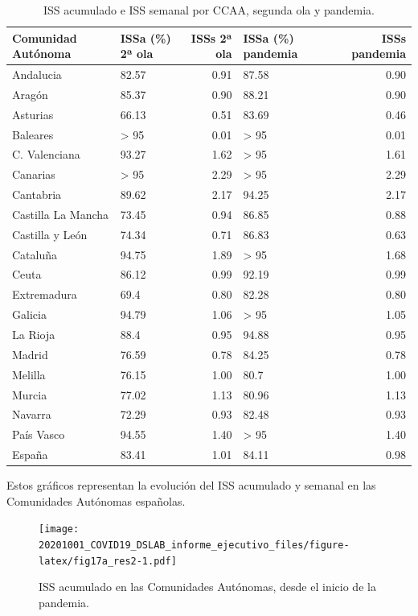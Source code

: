 \documentclass[
  11pt,
]{article}
\begin{document}
\begin{table}[!h]

\caption{\label{tab:tabla}ISS acumulado e ISS semanal por CCAA, segunda ola y pandemia.}
\centering
\fontsize{9}{11}\selectfont
\begin{tabular}[t]{l|l|r|l|r}
\hline
Comunidad Autónoma & ISSa (\%) 2ª ola & ISSs 2ª ola & ISSa (\%) pandemia & ISSs pandemia\\
\hline
Andalucia & 82.57 & 0.91 & 87.58 & 0.90\\
\hline
Aragón & 85.37 & 0.90 & 88.21 & 0.90\\
\hline
Asturias & 66.13 & 0.51 & 83.69 & 0.46\\
\hline
Baleares & > 95 & 0.01 & > 95 & 0.01\\
\hline
C. Valenciana & 93.27 & 1.62 & > 95 & 1.61\\
\hline
Canarias & > 95 & 2.29 & > 95 & 2.29\\
\hline
Cantabria & 89.62 & 2.17 & 94.25 & 2.17\\
\hline
Castilla La Mancha & 73.45 & 0.94 & 86.85 & 0.88\\
\hline
Castilla y León & 74.34 & 0.71 & 86.83 & 0.63\\
\hline
Cataluña & 94.75 & 1.89 & > 95 & 1.68\\
\hline
Ceuta & 86.12 & 0.99 & 92.19 & 0.99\\
\hline
Extremadura & 69.4 & 0.80 & 82.28 & 0.80\\
\hline
Galicia & 94.79 & 1.06 & > 95 & 1.05\\
\hline
La Rioja & 88.4 & 0.95 & 94.88 & 0.95\\
\hline
Madrid & 76.59 & 0.78 & 84.25 & 0.78\\
\hline
Melilla & 76.15 & 1.00 & 80.7 & 1.00\\
\hline
Murcia & 77.02 & 1.13 & 80.96 & 1.13\\
\hline
Navarra & 72.29 & 0.93 & 82.48 & 0.93\\
\hline
País Vasco & 94.55 & 1.40 & > 95 & 1.40\\
\hline
España & 83.41 & 1.01 & 84.11 & 0.98\\
\hline
\end{tabular}
\end{table}

Estos gráficos representan la evolución del ISS acumulado y semanal en
las Comunidades Autónomas españolas.

\vspace{0.2cm}

\begin{figure}
\centering
\texttt{[image: 20201001\_COVID19\_DSLAB\_informe\_ejecutivo\_files/figure-latex/fig17a\_res2-1.pdf]}
\caption{\label{fig:fig17a_res} ISS acumulado en las Comunidades
Autónomas, desde el inicio de la pandemia.}
\end{figure}
\end{document}

